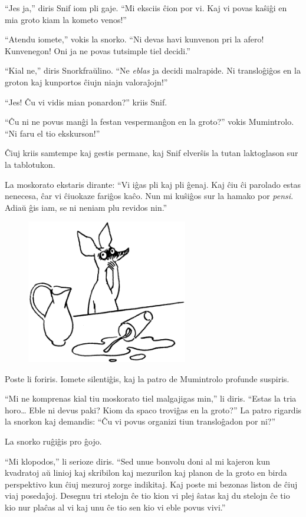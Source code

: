 ``Jes ja,'' diris Snif iom pli gaje. ``Mi eksciis ĉion por vi. Kaj vi povas kaŝiĝi en mia groto kiam la kometo venos!''

``Atendu iomete,'' vokis la snorko. ``Ni devas havi kunvenon pri la afero! Kunvenegon! Oni ja ne povas tutsimple tiel decidi.''

``Kial ne,'' diris Snorkfraŭlino. ``Ne \emph{eblas} ja decidi malrapide. Ni transloĝiĝos en la groton kaj kunportos ĉiujn niajn valoraĵojn!''

``Jes! Ĉu vi vidis mian ponardon?'' kriis Snif.

``Ĉu ni ne povus manĝi la festan vespermanĝon en la groto?'' vokis Mumintrolo. ``Ni faru el tio ekskurson!''

Ĉiuj kriis samtempe kaj gestis permane, kaj Snif elverŝis la tutan laktoglason sur la tablotukon.

La moskorato ekstaris dirante: ``Vi iĝas pli kaj pli ĝenaj. Kaj ĉiu ĉi parolado estas nenecesa, ĉar vi ĉiuokaze fariĝos kaĉo. Nun mi kuŝiĝos sur la hamako por \emph{pensi}. Adiaŭ ĝis iam, se ni neniam plu revidos nin.''

\begin{figure}[htbp]
\centering
\includegraphics[width=200pt,height=179pt]{9-3.png}
\caption{}
\label{9-3}
\end{figure}

Poste li foriris. Iomete silentiĝis, kaj la patro de Mumintrolo profunde suspiris.

``Mi ne komprenas kial tiu moskorato tiel malgajigas min,'' li diris. ``Estas la tria horo{\ldots} Eble ni devus paki? Kiom da spaco troviĝas en la groto?'' La patro rigardis la snorkon kaj demandis: ``Ĉu vi povus organizi tiun transloĝadon por ni?''

La snorko ruĝiĝis pro ĝojo.

``Mi klopodos,'' li serioze diris. ``Sed unue bonvolu doni al mi kajeron kun kvadratoj aŭ linioj kaj skribilon kaj mezurilon kaj planon de la groto en birda perspektivo kun ĉiuj mezuroj zorge indikitaj. Kaj poste mi bezonas liston de ĉiuj viaj posedaĵoj. Desegnu tri stelojn ĉe tio kion vi plej ŝatas kaj du stelojn ĉe tio kio nur plaĉas al vi kaj unu ĉe tio sen kio vi eble povus vivi.''

